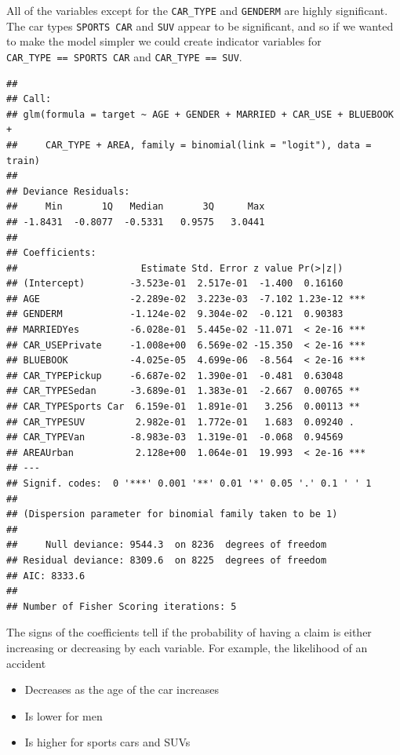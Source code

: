 \documentclass[
  openany]{book}
\newenvironment{Shaded}{\begin{snugshade}}{\end{snugshade}}
\newcommand{\KeywordTok}[1]{\textcolor[rgb]{0.13,0.29,0.53}{\textbf{#1}}}
\newcommand{\NormalTok}[1]{#1}
\newcommand{\OperatorTok}[1]{\textcolor[rgb]{0.81,0.36,0.00}{\textbf{#1}}}
\newcommand{\StringTok}[1]{\textcolor[rgb]{0.31,0.60,0.02}{#1}}
\providecommand{\tightlist}{%
  \setlength{\itemsep}{0pt}\setlength{\parskip}{0pt}}
\begin{document}
All of the variables except for the \texttt{CAR\_TYPE} and \texttt{GENDERM} are highly significant. The car types \texttt{SPORTS\ CAR} and \texttt{SUV} appear to be significant, and so if we wanted to make the model simpler we could create indicator variables for \texttt{CAR\_TYPE\ ==\ SPORTS\ CAR} and \texttt{CAR\_TYPE\ ==\ SUV}.

\begin{Shaded}
\end{Shaded}

\begin{verbatim}
## 
## Call:
## glm(formula = target ~ AGE + GENDER + MARRIED + CAR_USE + BLUEBOOK + 
##     CAR_TYPE + AREA, family = binomial(link = "logit"), data = train)
## 
## Deviance Residuals: 
##     Min       1Q   Median       3Q      Max  
## -1.8431  -0.8077  -0.5331   0.9575   3.0441  
## 
## Coefficients:
##                      Estimate Std. Error z value Pr(>|z|)    
## (Intercept)        -3.523e-01  2.517e-01  -1.400  0.16160    
## AGE                -2.289e-02  3.223e-03  -7.102 1.23e-12 ***
## GENDERM            -1.124e-02  9.304e-02  -0.121  0.90383    
## MARRIEDYes         -6.028e-01  5.445e-02 -11.071  < 2e-16 ***
## CAR_USEPrivate     -1.008e+00  6.569e-02 -15.350  < 2e-16 ***
## BLUEBOOK           -4.025e-05  4.699e-06  -8.564  < 2e-16 ***
## CAR_TYPEPickup     -6.687e-02  1.390e-01  -0.481  0.63048    
## CAR_TYPESedan      -3.689e-01  1.383e-01  -2.667  0.00765 ** 
## CAR_TYPESports Car  6.159e-01  1.891e-01   3.256  0.00113 ** 
## CAR_TYPESUV         2.982e-01  1.772e-01   1.683  0.09240 .  
## CAR_TYPEVan        -8.983e-03  1.319e-01  -0.068  0.94569    
## AREAUrban           2.128e+00  1.064e-01  19.993  < 2e-16 ***
## ---
## Signif. codes:  0 '***' 0.001 '**' 0.01 '*' 0.05 '.' 0.1 ' ' 1
## 
## (Dispersion parameter for binomial family taken to be 1)
## 
##     Null deviance: 9544.3  on 8236  degrees of freedom
## Residual deviance: 8309.6  on 8225  degrees of freedom
## AIC: 8333.6
## 
## Number of Fisher Scoring iterations: 5
\end{verbatim}

The signs of the coefficients tell if the probability of having a claim is either increasing or decreasing by each variable. For example, the likelihood of an accident

\begin{itemize}
\tightlist
\item
  Decreases as the age of the car increases
\item
  Is lower for men
\item
  Is higher for sports cars and SUVs
\end{itemize}
\end{document}
